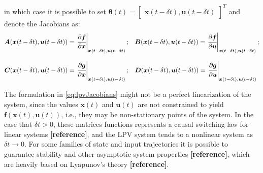 \documentclass[a4paper,11pt]{book}
\numberwithin{figure}{chapter}
\numberwithin{equation}{chapter}
\numberwithin{table}{chapter}
\theoremstyle{definition}
\begin{document}
\noindent in which case it is possible to set $\bm{\theta}(t) = \begin{bmatrix} \bm{x}(t-\delta t), \bm{u}(t-\delta t) \end{bmatrix}^T$ and denote the Jacobians as:
\begin{align} \label{eq:lpvJacobians}
\begin{matrix*}[l]
        \bm{A}(\bm{x}(t-\delta t), \bm{u}(t-\delta t)) = \left. \cfrac{\partial \bm{f}}{\partial \bm{x}}\right\vert_{\bm{x}(t-\delta t), \bm{u}(t-\delta t)}; & \bm{B}(\bm{x}(t-\delta t), \bm{u}(t-\delta t)) = \left. \cfrac{\partial \bm{f}}{\partial \bm{u}}\right\vert_{\bm{x}(t-\delta t), \bm{u}(t-\delta t)}; \\ \\ \bm{C}(\bm{x}(t-\delta t), \bm{u}(t-\delta t)) = \left. \cfrac{\partial \bm{g}}{\partial \bm{x}}\right\vert_{\bm{x}(t-\delta t), \bm{u}(t-\delta t)} ; & \bm{D}(\bm{x}(t-\delta t), \bm{u}(t-\delta t)) = \left. \cfrac{\partial \bm{g}}{\partial \bm{u}}\right\vert_{\bm{x}(t-\delta t), \bm{u}(t-\delta t)} 
\end{matrix*}
\end{align}

The formulation in \eqref{eq:lpvJacobians} might not be a perfect linearization of the system, since the values $\bm{x}(t)$ and $\bm{u}(t)$ are not constrained to yield $\bm{f}(\bm{x}(t), \bm{u}(t))$, i.e., they may be non-stationary points of the system. In the case that $\delta t > 0$, these matrices functions represents a causal switching law for linear systems \textbf{[reference]}, and the LPV system tends to a nonlinear system as $\delta t \to 0$. For some families of state and input trajectories it is possible to guarantee stability and other asymptotic system properties \textbf{[reference]}, which are heavily based on Lyapunov's theory \textbf{[reference]}. 
\end{document}
